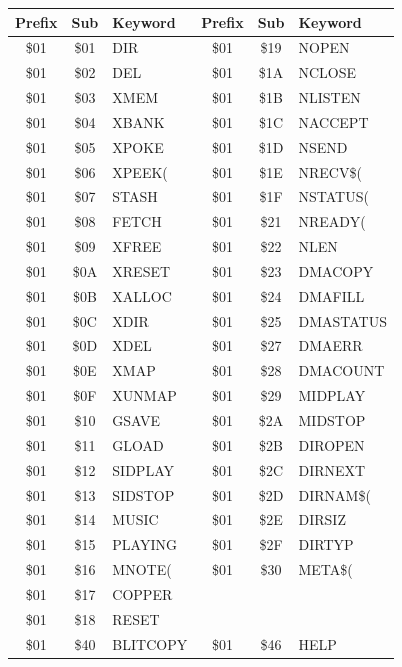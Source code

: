 \begin{center}
\begin{longtable}{ccl|ccl}
\toprule
\textbf{Prefix} & \textbf{Sub} & \textbf{Keyword} &
\textbf{Prefix} & \textbf{Sub} & \textbf{Keyword} \\
\midrule
\endhead
\$01 & \$01 & DIR         & \$01 & \$19 & NOPEN       \\
\$01 & \$02 & DEL         & \$01 & \$1A & NCLOSE      \\
\$01 & \$03 & XMEM        & \$01 & \$1B & NLISTEN     \\
\$01 & \$04 & XBANK       & \$01 & \$1C & NACCEPT     \\
\$01 & \$05 & XPOKE       & \$01 & \$1D & NSEND       \\
\$01 & \$06 & XPEEK(      & \$01 & \$1E & NRECV\$(    \\
\$01 & \$07 & STASH       & \$01 & \$1F & NSTATUS(    \\
\$01 & \$08 & FETCH       & \$01 & \$21 & NREADY(     \\
\$01 & \$09 & XFREE       & \$01 & \$22 & NLEN        \\
\$01 & \$0A & XRESET      & \$01 & \$23 & DMACOPY     \\
\$01 & \$0B & XALLOC      & \$01 & \$24 & DMAFILL     \\
\$01 & \$0C & XDIR        & \$01 & \$25 & DMASTATUS   \\
\$01 & \$0D & XDEL        & \$01 & \$27 & DMAERR      \\
\$01 & \$0E & XMAP        & \$01 & \$28 & DMACOUNT    \\
\$01 & \$0F & XUNMAP      & \$01 & \$29 & MIDPLAY     \\
\$01 & \$10 & GSAVE       & \$01 & \$2A & MIDSTOP     \\
\$01 & \$11 & GLOAD       & \$01 & \$2B & DIROPEN     \\
\$01 & \$12 & SIDPLAY     & \$01 & \$2C & DIRNEXT     \\
\$01 & \$13 & SIDSTOP     & \$01 & \$2D & DIRNAM\$(   \\
\$01 & \$14 & MUSIC       & \$01 & \$2E & DIRSIZ      \\
\$01 & \$15 & PLAYING     & \$01 & \$2F & DIRTYP      \\
\$01 & \$16 & MNOTE(      & \$01 & \$30 & META\$(     \\
\$01 & \$17 & COPPER      & & & \\
\$01 & \$18 & RESET       & & & \\
\midrule
\$01 & \$40 & BLITCOPY    & \$01 & \$46 & HELP        \\

\end{longtable}
\end{center}
